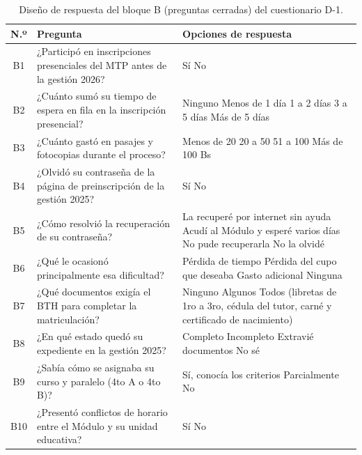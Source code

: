 \begin{table}[htbp]
    \centering
    \caption{Diseño de respuesta del bloque B (preguntas cerradas) del cuestionario D-1.}
    \label{tab:d1_cerradas}
    \begin{tabularx}{\textwidth}{c L L}
        \toprule
        \textbf{N.º} & \textbf{Pregunta} & \textbf{Opciones de respuesta} \\
        \midrule
        B1 & ¿Participó en inscripciones presenciales del MTP antes de la gestión 2026? & \casilla{} Sí \quad \casilla{} No \\
        B2 & ¿Cuánto sumó su tiempo de espera en fila en la inscripción presencial? & \casilla{} Ninguno \quad \casilla{} Menos de 1 día \quad \casilla{} 1 a 2 días \quad \casilla{} 3 a 5 días \quad \casilla{} Más de 5 días \\
        B3 & ¿Cuánto gastó en pasajes y fotocopias durante el proceso? & \casilla{} Menos de 20 \quad \casilla{} 20 a 50 \quad \casilla{} 51 a 100 \quad \casilla{} Más de 100 Bs \\
        B4 & ¿Olvidó su contraseña de la página de preinscripción de la gestión 2025? & \casilla{} Sí \quad \casilla{} No \\
        B5 & ¿Cómo resolvió la recuperación de su contraseña? & \casilla{} La recuperé por internet sin ayuda \quad \casilla{} Acudí al Módulo y esperé varios días \quad \casilla{} No pude recuperarla \quad \casilla{} No la olvidé \\
        B6 & ¿Qué le ocasionó principalmente esa dificultad? & \casilla{} Pérdida de tiempo \quad \casilla{} Pérdida del cupo que deseaba \quad \casilla{} Gasto adicional \quad \casilla{} Ninguna \\
        B7 & ¿Qué documentos exigía el BTH para completar la matriculación? & \casilla{} Ninguno \quad \casilla{} Algunos \quad \casilla{} Todos (libretas de 1ro a 3ro, cédula del tutor, carné y certificado de nacimiento) \\
        B8 & ¿En qué estado quedó su expediente en la gestión 2025? & \casilla{} Completo \quad \casilla{} Incompleto \quad \casilla{} Extravié documentos \quad \casilla{} No sé \\
        B9 & ¿Sabía cómo se asignaba su curso y paralelo (4to A o 4to B)? & \casilla{} Sí, conocía los criterios \quad \casilla{} Parcialmente \quad \casilla{} No \\
        B10 & ¿Presentó conflictos de horario entre el Módulo y su unidad educativa? & \casilla{} Sí \quad \casilla{} No \\
        \bottomrule
    \end{tabularx}
\end{table}

